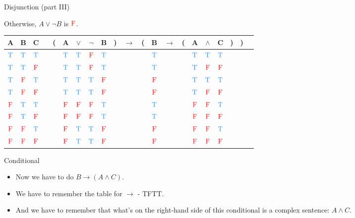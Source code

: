 \documentclass[
  ignorenonframetext,
]{beamer}
\providecommand{\tightlist}{%
  \setlength{\itemsep}{0pt}\setlength{\parskip}{0pt}}
\renewcommand{\,}{\text{, }}
\def\True{\textcolor{dodgerblue}{\text{T}}}
\def\False{\textcolor{red}{\text{F}}}
\begin{document}
\begin{frame}{Disjunction (part III)}
\protect\hypertarget{disjunction-part-iii}{}

Otherwise, \(A \vee \neg B\) is \(\False\).

\begin{center}
\bigskip
\begin{tabular}{@{ }c@{ }@{ }c@{ }@{ }c | c@{ }@{}c@{}@{ }c@{ }@{ }c@{ }@{ }c@{ }@{ }c@{ }@{}c@{}@{ }c@{ }@{}c@{}@{ }c@{ }@{ }c@{ }@{}c@{}@{ }c@{ }@{ }c@{ }@{ }c@{ }@{}c@{}@{}c@{}@{ }c}
A & B & C &  & ( & A & $\vee$ & $\neg$ & B & ) & $\rightarrow$ & ( & B & $\rightarrow$ & ( & A & $\wedge$ & C & ) & ) & \\
\hline 
 $\True$ & $\True$ & $\True$ &  &  & $\True$ & $\True$ & $\False$ & $\True$ &  &&  & $\True$ &&  & $\True$ & $\True$ & $\True$ &  &  & \\
 $\True$ & $\True$ & $\False$ &  &  & $\True$ & $\True$ & $\False$ & $\True$ &  &&  & $\True$ &&  & $\True$ & $\False$ & $\False$ &  &  & \\
 $\True$ & $\False$ & $\True$ &  &  & $\True$ & $\True$ & $\True$ & $\False$ &  &&  & $\False$ &&  & $\True$ & $\True$ & $\True$ &  &  & \\
 $\True$ & $\False$ & $\False$ &  &  & $\True$ & $\True$ & $\True$ & $\False$ &  &&  & $\False$ &&  & $\True$ & $\False$ & $\False$ &  &  & \\
 $\False$ & $\True$ & $\True$ &  &  & $\False$ & $\False$ & $\False$ & $\True$ &  &&  & $\True$ &&  & $\False$ & $\False$ & $\True$ &  &  & \\
 $\False$ & $\True$ & $\False$ &  &  & $\False$ & $\False$ & $\False$ & $\True$ &  &&  & $\True$ &&  & $\False$ & $\False$ & $\False$ &  &  & \\
 $\False$ & $\False$ & $\True$ &  &  & $\False$ & $\True$ & $\True$ & $\False$ &  &&  & $\False$ &&  & $\False$ & $\False$ & $\True$ &  &  & \\
 $\False$ & $\False$ & $\False$ &  &  & $\False$ & $\True$ & $\True$ & $\False$ &  &&  & $\False$ &&  & $\False$ & $\False$ & $\False$ &  &  & \\
\end{tabular}
\bigskip
\end{center}

\end{frame}

\begin{frame}{Conditional}
\protect\hypertarget{conditional}{}

\begin{itemize}
\tightlist
\item
  Now we have to do \(B \rightarrow (A \wedge C)\).
\item
  We have to remember the table for \(\rightarrow\) - TFTT.
\item
  And we have to remember that what's on the right-hand side of this
  conditional is a complex sentence: \(A \wedge C\).
\end{itemize}

\end{frame}
\end{document}
